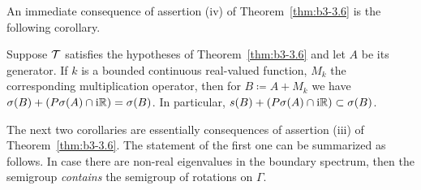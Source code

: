 An immediate consequence of assertion (iv) of Theorem~\ref{thm:b3-3.6} is the following corollary. 
\begin{corollary}\label{cor:b3-3.7}
%
Suppose $\mathcal{T}$ satisfies the hypotheses of Theorem~\ref{thm:b3-3.6} and let $A$ be its generator.
If $k$ is a bounded continuous real-valued function, $M_{k}$ the corresponding multiplication operator, then for $B \coloneq A + M_{k}$ we have $\sigma(B) + \left(P\sigma(A)\cap \mathrm{i}\mathbb{R}\right) = \sigma(B)$.
In particular, $s(B) + \left(P\sigma(A)\cap \mathrm{i}\mathbb{R}\right) \subset \sigma(B)$.
\end{corollary}
The next two corollaries are essentially consequences of assertion (iii) of Theorem~\ref{thm:b3-3.6}. 
The statement of the first one can be summarized as follows. 
In case there are non-real eigenvalues in the boundary spectrum, then 
the semigroup \emph{contains} the semigroup of rotations on $\Gamma$.


